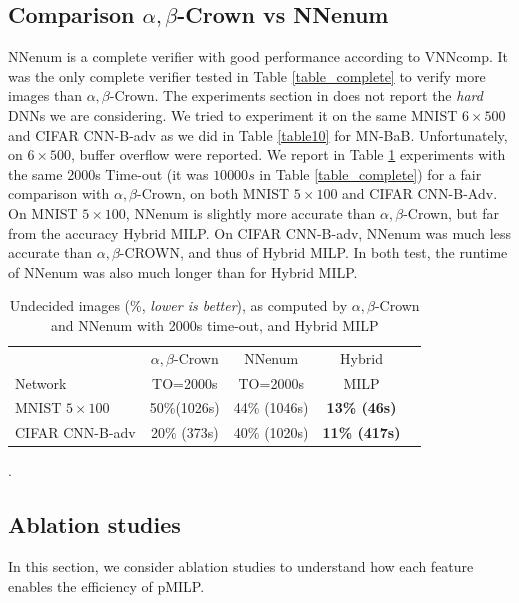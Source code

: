\newpage

	\subsection*{Comparison $\alpha,\beta$-Crown vs NNenum}

NNenum \cite{nnenum} is a complete verifier with good performance according to VNNcomp.
It was the only complete verifier tested in Table \ref{table_complete} to verify more images than $\alpha,\beta$-Crown. The experiments section in \cite{nnenum} does not report
the {\em hard} DNNs we are considering. We tried to experiment it on the same MNIST 
$6 \times 500$ and CIFAR CNN-B-adv as we did in Table \ref{table10} for MN-BaB. Unfortunately, on $6 \times 500$, buffer overflow were reported.
We report in Table \ref{table11} experiments with the same 2000s Time-out (it was $10 000s$ in Table \ref{table_complete})  for a fair comparison with $\alpha,\beta$-Crown, on both 
MNIST $5 \times 100$ and CIFAR CNN-B-Adv. 
On MNIST $5 \times 100$, NNenum is slightly more accurate than $\alpha,\beta$-Crown, but far from the accuracy Hybrid MILP.
On CIFAR CNN-B-adv, NNenum was much less accurate than $\alpha,\beta$-CROWN, and thus of Hybrid MILP. In both test, the runtime of NNenum was also much longer than for Hybrid MILP.


\begin{table}[h!]
	\centering
	\begin{tabular}{||l||c||c||c||c||}
		\hline \hline
		 & $\alpha,\beta$-Crown & NNenum & Hybrid\\ 
		 Network & TO=2000s &  TO=2000s & MILP\\ 
		\hline
		MNIST $5 \times 100$ & 50\%(1026s) & 44\% (1046s) & \bf 13\% (46s)\\ \hline
		CIFAR CNN-B-adv & 20\% (373s) & 40\% (1020s) & \bf 11\% (417s)\\ \hline 
	\end{tabular}
	\caption{Undecided images ($\%$, {\em lower is better}), as computed by $\alpha,\beta$-Crown and NNenum with 2000s time-out, and Hybrid MILP}.
	\label{table11}
\end{table}





\subsection*{Ablation studies}	

In this section, we consider ablation studies to understand how each feature enables the efficiency of pMILP.

